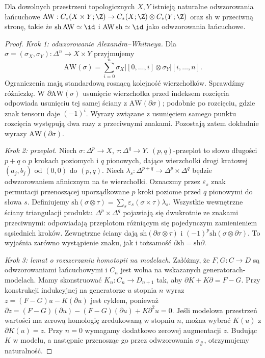\begin{twierdzenie}
\label{thm:ez-v4}
Dla dowolnych przestrzeni topologicznych $X,Y$ istnieją naturalne
odwzorowania łańcuchowe
$\mathrm{AW}:C_*(X\times Y;\Z)\to C_*(X;\Z)\otimes C_*(Y;\Z)$
oraz $\mathrm{sh}$ w przeciwną stronę, takie że
$\mathrm{sh}\,\mathrm{AW}\simeq\id$ i
$\mathrm{AW}\,\mathrm{sh}\simeq\id$ jako odwzorowania łańcuchowe.
\end{twierdzenie}
\begin{proof}
\emph{Krok 1: odwzorowanie Alexandra--Whitneya.}
Dla $\sigma=(\sigma_X,\sigma_Y):\Delta^n\to X\times Y$
przyjmujemy
\[
\mathrm{AW}(\sigma)=\sum_{i=0}^n
\sigma_X|[0,\ldots,i]\otimes\sigma_Y|[i,\ldots,n].
\]
Ograniczenia mają standardową rosnącą kolejność wierzchołków.
Sprawdźmy różniczkę. W $\partial\mathrm{AW}(\sigma)$
usunięcie wierzchołka przed indeksem rozcięcia odpowiada
usunięciu tej samej ściany z $\mathrm{AW}(\partial\sigma)$;
podobnie po rozcięciu, gdzie znak tensoru daje $(-1)^i$.
Wyrazy związane z usunięciem samego punktu rozcięcia
występują dwa razy z przeciwnymi znakami. Pozostają zatem
dokładnie wyrazy $\mathrm{AW}(\partial\sigma)$.

\emph{Krok 2: przeplot.}
Niech $\sigma:\Delta^p\to X$, $\tau:\Delta^q\to Y$.
$(p,q)$-przeplot to słowo długości $p+q$ o $p$ krokach
poziomych i $q$ pionowych, dające wierzchołki drogi kratowej
$(a_j,b_j)$ od $(0,0)$ do $(p,q)$. Niech
$\lambda_s:\Delta^{p+q}\to\Delta^p\times\Delta^q$
będzie odwzorowaniem afinicznym na te wierzchołki. Oznaczmy przez
$\varepsilon_s$ znak permutacji przenoszącej uporządkowane
$p$ kroki poziome przed $q$ pionowymi do słowa $s$.
Definiujemy
$\mathrm{sh}(\sigma\otimes\tau)
=\sum_s\varepsilon_s(\sigma\times\tau)\lambda_s$.
Wszystkie wewnętrzne ściany triangulacji produktu
$\Delta^p\times\Delta^q$ pojawiają się dwukrotnie ze znakami
przeciwnymi: odpowiadają przeplotom różniącym się pojedynczym
zamienieniem sąsiednich kroków. Zewnętrzne ściany dają
$\mathrm{sh}(\partial\sigma\otimes\tau)$ i
$(-1)^p\mathrm{sh}(\sigma\otimes\partial\tau)$.
To wyjaśnia zarówno wystąpienie znaku, jak i tożsamość
$\partial\mathrm{sh}=\mathrm{sh}\partial$.

\emph{Krok 3: lemat o rozszerzaniu homotopii na modelach.}
Załóżmy, że $F,G:C\to D$ są odwzorowaniami łańcuchowymi i $C_n$
jest wolna na wskazanych generatorach-modelach. Mamy skonstruować
$K_n:C_n\to D_{n+1}$ tak, aby $\partial K+K\partial=F-G$.
Przy konstrukcji indukcyjnej na generatorze $u$ stopnia $n$
wyraz $z=(F-G)u-K(\partial u)$ jest cyklem, ponieważ
$\partial z=(F-G)(\partial u)-(F-G)(\partial u)+K\partial^2u=0$.
Jeśli modelowa przestrzeń wartości ma zerową homologię
zredukowaną w stopniu $n$, można wybrać $K(u)$ z
$\partial K(u)=z$. Przy $n=0$ wymagamy dodatkowo zerowej
augmentacji $z$. Budując $K$ w modelu, a następnie
przenosząc go przez odwzorowania $\sigma_\#$, otrzymujemy naturalność.


\end{proof}
